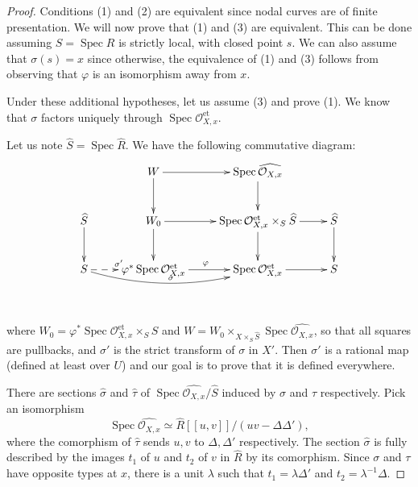 \documentclass[a4paper,12pt]{amsart} %
\numberwithin{equation}{subsection}
\newcommand{\on}[1]{\operatorname{#1}}
\newcommand{\Spec}{\operatorname{Spec}}
\theoremstyle{definition}
\theoremstyle{plain}%
\theoremstyle{remark}
\renewcommand{\phi}{\varphi}
\renewcommand{\O}{\mathcal{O}}
\begin{document}
\begin{proof}
Conditions (1) and (2) are equivalent since nodal curves are of finite presentation. We will now prove that (1) and (3) are equivalent. This can be done assuming $S=\Spec R$ is strictly local, with closed point $s$. We can also assume that $\sigma(s)=x$ since otherwise, the equivalence of (1) and (3) follows from observing that $\phi$ is an isomorphism away from $x$.

	Under these additional hypotheses, let us assume (3) and prove (1). We know that $\sigma$ factors uniquely through $\Spec\O_{X,x}^{\on{et}}$.
	
		Let us note $\widehat{S}=\Spec\widehat{R}$. We have the following commutative diagram: 
		\[
		\xymatrix{
			&W\ar[r]\ar[d]			& \Spec\widehat{\O_{X,x}}\ar[d]					&				\\
			\widehat{S}		\ar[d]	& W_0\ar[r]\ar[d]		& \Spec\O_{X,x}^{\on{et}}\times_S\widehat{S}\ar[d]\ar[r]	&\widehat{S}\ar[d]\\
			S\ar@{-->}[r]^{\sigma'}\ar@/_1pc/[rr]^\sigma	& \phi^*\Spec\O_{X,x}^{\on{et}}\ar[r]^\phi			& \Spec\O_{X,x}^{\on{et}}\ar[r]							&S\\
			\\
		}
		\]
		where $W_0=\phi^*\Spec\O_{X,x}^{\on{et}}\times_S\widehat{S}$ and $W=W_0\times_{X\times_S\widehat{S}}\Spec\widehat{\O_{X,x}}$, so that all squares are pullbacks, and $\sigma'$ is the strict transform of $\sigma$ in $X'$. Then $\sigma'$ is a rational map (defined at least over $U$) and our goal is to prove that it is defined everywhere.
		
		There are sections $\widehat{\sigma}$ and $\widehat{\tau}$ of $\Spec\widehat{\O_{X,x}}/\widehat{S}$ induced by $\sigma$ and $\tau$ respectively. Pick an isomorphism
		\[
		\Spec\widehat{\O_{X,x}}\simeq\widehat{R}[[u,v]]/(uv-\Delta\Delta'),
		\]
		where the comorphism of $\widehat{\tau}$ sends $u,v$ to $\Delta,\Delta'$ respectively. The section $\widehat{\sigma}$ is fully described by the images $t_1$ of $u$ and $t_2$ of $v$ in $\widehat{R}$ by its comorphism. Since $\sigma$ and $\tau$ have opposite types at $x$, there is a unit $\lambda$ such that $t_1=\lambda\Delta'$ and $t_2=\lambda^{-1}\Delta$.
		

\end{proof}
\end{document}
